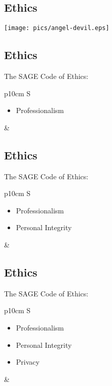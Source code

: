 \documentclass[xga]{xdvislides}
\begin{document}
\subsection{Ethics}

\begin{center}
	\texttt{[image: pics/angel-devil.eps]}
\end{center}


\subsection{Ethics}
The SAGE Code of Ethics:
\\

\begin{tabular}{ p{10cm} S }
\begin{itemize}
	\item Professionalism
\end{itemize}
&  \\
\end{tabular}

\subsection{Ethics}
The SAGE Code of Ethics:
\\

\begin{tabular}{ p{10cm} S }
\begin{itemize}
	\item Professionalism
	\item Personal Integrity
\end{itemize}
&  \\
\end{tabular}

\subsection{Ethics}
The SAGE Code of Ethics:
\\

\begin{tabular}{ p{10cm} S }
\begin{itemize}
	\item Professionalism
	\item Personal Integrity
	\item Privacy
\end{itemize}
&  \\
\end{tabular}
\end{document}
